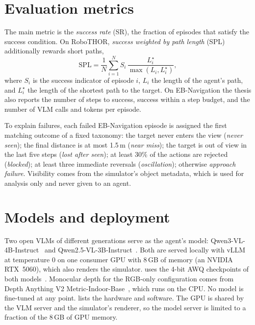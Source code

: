 \section{Evaluation metrics}
\label{sec:pre-metrics}
The main metric is the \emph{success rate} (SR), the fraction of episodes that satisfy the success condition. On
RoboTHOR, \emph{success weighted by path length} (SPL)~\cite{anderson2018evaluation} additionally rewards short paths,
\begin{equation}
\mathrm{SPL}=\frac{1}{N}\sum_{i=1}^{N} S_i\,\frac{L_i^\star}{\max(L_i,L_i^\star)},
\label{eq:spl}
\end{equation}
where $S_i$ is the success indicator of episode $i$, $L_i$ the length of the agent's path, and $L_i^\star$ the
length of the shortest path to the target. On EB-Navigation the thesis also reports the number of steps to success,
success within a step budget, and the number of VLM calls and tokens per episode.

To explain failures, each failed EB-Navigation episode is assigned the first matching outcome of a fixed taxonomy:
the target never enters the view (\emph{never seen}); the final distance is at most 1.5\,m (\emph{near miss}); the
target is out of view in the last five steps (\emph{lost after seen}); at least 30\% of the actions are rejected
(\emph{blocked}); at least three immediate reversals (\emph{oscillation}); otherwise \emph{approach failure}.
Visibility comes from the simulator's object metadata, which is used for analysis only and never given to an agent.

\section{Models and deployment}
\label{sec:pre-models}
Two open VLMs of different generations serve as the agent's model: Qwen3-VL-4B-Instruct~\cite{bai2025qwen3vl} and
Qwen2.5-VL-3B-Instruct~\cite{bai2025qwen25vl}. Both are served locally with vLLM~\cite{kwon2023vllm} at temperature 0
on one consumer GPU with 8\,GB of memory (an NVIDIA RTX~5060), which also renders the simulator. \ours uses the 4-bit
AWQ checkpoints of both models~\cite{lin2024awq}. Monocular depth for the RGB-only configuration comes from Depth
Anything V2 Metric-Indoor-Base~\cite{yang2024depthv2}, which runs on the CPU. No model is fine-tuned at any point.  lists the hardware and software. The GPU is shared by the
VLM server and the simulator's renderer, so the model server is limited to a fraction of the 8\,GB of GPU memory.

